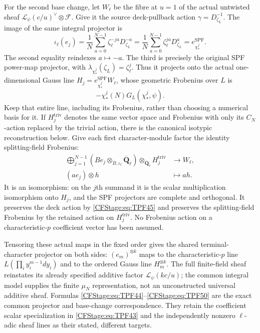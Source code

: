 For the second base change, let \(W_\ell\)
be the fibre at \(u=1\) of the actual
untwisted sheaf
\(\mathcal L_\psi(c/u)^\vee\otimes\mathcal F\).
Give it the source deck-pullback action
\(\gamma=D_{\zeta_L}^{-1}\).
The image of the same integral projector is
\[
 \iota_\ell(e_j)
   =\frac1N\sum_{a=0}^{N-1}
        \zeta_\ell^{-ja}D_{\zeta_L}^{-a}
   =\frac1N\sum_{a=0}^{N-1}
        \zeta_\ell^{ja}D_{\zeta_L}^{a}
   =e_{\chi_*^j}^{\mathrm{SPF}} .
 \tag{TPF.49}\label{CFStage:eq:TPF49}
\]
The second equality reindexes \(a\mapsto-a\).
The third is precisely the original SPF
power-map projector, with
\(\lambda_{\chi_*^j}(\zeta_L)=\zeta_\ell^j\).
Thus it projects onto the actual
one-dimensional Gauss line
\(H_j=e_{\chi_*^j}^{\mathrm{SPF}}W_\ell\),
whose geometric Frobenius over \(L\) is
\[
 -\chi_*^j(N)G_L(\chi_*^j,\psi).
\]
Keep that entire line, including its
Frobenius, rather than choosing a numerical
basis for it. If \(H_j^{\mathrm{triv}}\)
denotes the same vector space and Frobenius
with only its \(C_N\)-action replaced by
the trivial action, there is the canonical
isotypic reconstruction below. Give each
first character-module factor the identity
splitting-field Frobenius:
\[
 \begin{split}
 \bigoplus_{j=1}^{N-1}
    \left(B e_j\otimes_{B,\iota_\ell}
                     \overline{\mathbf Q}_\ell\right)
            \otimes_{\overline{\mathbf Q}_\ell}
                         H_j^{\mathrm{triv}}
       &\longrightarrow W_\ell,\\
 (a e_j)\otimes h&\longmapsto a h .
 \end{split}
 \tag{TPF.50}\label{CFStage:eq:TPF50}
\]
It is an isomorphism: on the \(j\)th
summand it is the scalar multiplication
isomorphism onto \(H_j\), and the SPF
projectors are complete and orthogonal.
It preserves the deck action by
\eqref{CFStage:eq:TPF45} and preserves the
splitting-field Frobenius by the retained
action on \(H_j^{\mathrm{triv}}\).
No Frobenius action on a characteristic-\(p\)
coefficient vector has been assumed.

Tensoring these actual maps in the fixed
order gives the shared terminal-character
projector on both sides:
\((e_m)^{\otimes k}\) maps to the
characteristic-\(p\) line
\(L(\prod_i y_i^{m-1}dy_i)\) and to
the ordered Gauss line \(H_m^{\otimes k}\).
The full finite-field sheaf reinstates
its already specified additive factor
\(\mathcal L_\psi(kc/u)\); the common
integral model supplies the finite
\(\mu_N\) representation, not an
unconstructed universal additive sheaf.
Formulas \eqref{CFStage:eq:TPF44}--\eqref{CFStage:eq:TPF50}
are the exact common projector and
base-change correspondence. They retain
the coefficient scalar specialization
in \eqref{CFStage:eq:TPF43} and the independently
nonzero \(\ell\)-adic sheaf lines as
their stated, different targets.

